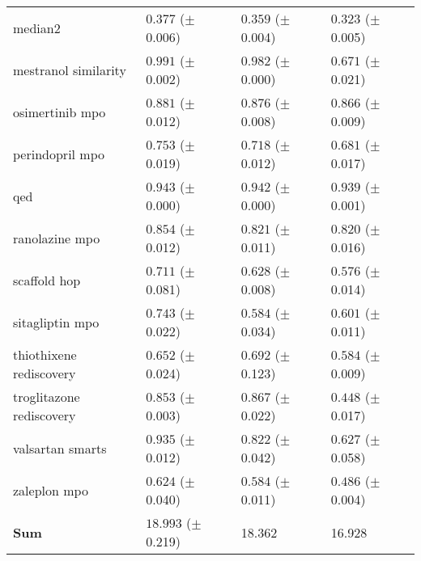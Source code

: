 \begin{table}[ht]
\begin{tabularx}{\linewidth}{l|>{}p{2.2cm} Y Y }
\small{median2} & $\mathbf{0.377}$ {\tiny ($\pm$ 0.006)} & $0.359$ {\tiny ($\pm$ 0.004)} & $0.323$ {\tiny ($\pm$ 0.005)} \\
\small{mestranol similarity} & $\mathbf{0.991}$ {\tiny ($\pm$ 0.002)} & $0.982$ {\tiny ($\pm$ 0.000)} & $0.671$ {\tiny ($\pm$ 0.021)} \\
\small{osimertinib mpo} & $\mathbf{0.881}$ {\tiny ($\pm$ 0.012)} & $\mathbf{0.876}$ {\tiny ($\pm$ 0.008)} & $0.866$ {\tiny ($\pm$ 0.009)} \\
\small{perindopril mpo} & $\mathbf{0.753}$ {\tiny ($\pm$ 0.019)} & $0.718$ {\tiny ($\pm$ 0.012)} & $0.681$ {\tiny ($\pm$ 0.017)} \\
\small{qed} & $\mathbf{0.943}$ {\tiny ($\pm$ 0.000)} & $0.942$ {\tiny ($\pm$ 0.000)} & $0.939$ {\tiny ($\pm$ 0.001)} \\
\small{ranolazine mpo} & $\mathbf{0.854}$ {\tiny ($\pm$ 0.012)} & $0.821$ {\tiny ($\pm$ 0.011)} & $0.820$ {\tiny ($\pm$ 0.016)} \\
\small{scaffold hop} & $\mathbf{0.711}$ {\tiny ($\pm$ 0.081)} & $0.628$ {\tiny ($\pm$ 0.008)} & $0.576$ {\tiny ($\pm$ 0.014)} \\
\small{sitagliptin mpo} & $\mathbf{0.743}$ {\tiny ($\pm$ 0.022)} & $0.584$ {\tiny ($\pm$ 0.034)} & $0.601$ {\tiny ($\pm$ 0.011)} \\
\small{thiothixene rediscovery} & $\mathbf{0.652}$ {\tiny ($\pm$ 0.024)} & $\mathbf{0.692}$ {\tiny ($\pm$ 0.123)} & $\mathbf{0.584}$ {\tiny ($\pm$ 0.009)} \\
\small{troglitazone rediscovery} & $\mathbf{0.853}$ {\tiny ($\pm$ 0.003)} & $\mathbf{0.867}$ {\tiny ($\pm$ 0.022)} & $0.448$ {\tiny ($\pm$ 0.017)} \\
\small{valsartan smarts} & $\mathbf{0.935}$ {\tiny ($\pm$ 0.012)} & $0.822$ {\tiny ($\pm$ 0.042)} & $0.627$ {\tiny ($\pm$ 0.058)} \\
\small{zaleplon mpo} & $\mathbf{0.624}$ {\tiny ($\pm$ 0.040)} & $\mathbf{0.584}$ {\tiny ($\pm$ 0.011)} & $0.486$ {\tiny ($\pm$ 0.004)} \\
\midrule
\textbf{Sum} & $\mathbf{18.993}$ {\tiny ($\pm$ 0.219)} & 18.362 & 16.928 \\
\bottomrule
\end{tabularx}
\end{table}